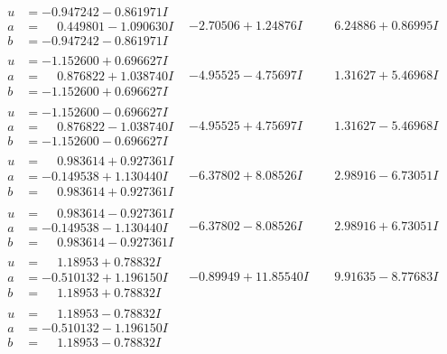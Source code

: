 \documentclass[1p]{elsarticle_modified}
\theoremstyle{definition}
\begin{document}
$$\begin{array}{c|c|c}
\begin{aligned}
u &= -0.947242 - 0.861971 I \\
a &= \phantom{-}0.449801 - 1.090630 I \\
b &= -0.947242 - 0.861971 I\end{aligned}
 & -2.70506 + 1.24876 I & \phantom{-}6.24886 + 0.86995 I \\ \hline\begin{aligned}
u &= -1.152600 + 0.696627 I \\
a &= \phantom{-}0.876822 + 1.038740 I \\
b &= -1.152600 + 0.696627 I\end{aligned}
 & -4.95525 - 4.75697 I & \phantom{-}1.31627 + 5.46968 I \\ \hline\begin{aligned}
u &= -1.152600 - 0.696627 I \\
a &= \phantom{-}0.876822 - 1.038740 I \\
b &= -1.152600 - 0.696627 I\end{aligned}
 & -4.95525 + 4.75697 I & \phantom{-}1.31627 - 5.46968 I \\ \hline\begin{aligned}
u &= \phantom{-}0.983614 + 0.927361 I \\
a &= -0.149538 + 1.130440 I \\
b &= \phantom{-}0.983614 + 0.927361 I\end{aligned}
 & -6.37802 + 8.08526 I & \phantom{-}2.98916 - 6.73051 I \\ \hline\begin{aligned}
u &= \phantom{-}0.983614 - 0.927361 I \\
a &= -0.149538 - 1.130440 I \\
b &= \phantom{-}0.983614 - 0.927361 I\end{aligned}
 & -6.37802 - 8.08526 I & \phantom{-}2.98916 + 6.73051 I \\ \hline\begin{aligned}
u &= \phantom{-}1.18953 + 0.78832 I \\
a &= -0.510132 + 1.196150 I \\
b &= \phantom{-}1.18953 + 0.78832 I\end{aligned}
 & -0.89949 + 11.85540 I & \phantom{-}9.91635 - 8.77683 I \\ \hline\begin{aligned}
u &= \phantom{-}1.18953 - 0.78832 I \\
a &= -0.510132 - 1.196150 I \\
b &= \phantom{-}1.18953 - 0.78832 I\end{aligned}

\end{array}$$
\end{document}
